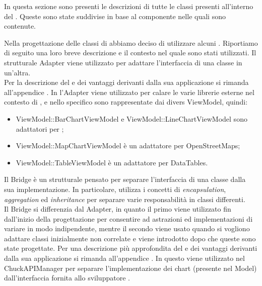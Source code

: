 		In questa sezione sono presenti le descrizioni di tutte le classi presenti all'interno del  . Queste sono state suddivise in base al componente nelle quali sono contenute.
		
		
	
		Nella progettazione delle classi di  abbiamo deciso di utilizzare alcuni . Riportiamo di seguito una loro breve descrizione e il contesto nel quale sono stati utilizzati.
			Il  strutturale Adapter viene utilizzato per adattare l'interfaccia di una classe in un'altra.\\
			Per la descrizione del  e dei vantaggi derivanti dalla sua applicazione si rimanda all'appendice .
				In  l'Adapter viene utilizzato per calare le varie librerie esterne nel contesto di \projectname{}, e nello specifico sono rappresentate dai divers ViewModel, quindi:
				\begin{itemize}
					\item ViewModel::BarChartViewModel e ViewModel::LineChartViewModel sono adattatori per ;
					\item ViewModel::MapChartViewModel è un adattatore per OpenStreetMaps;
					\item ViewModel::TableViewModel è un adattatore per DataTables.
				\end{itemize}
				
			Il Bridge è un  strutturale pensato per separare l'interfaccia di una classe dalla sua implementazione. In particolare, utilizza i concetti di \textit{encapsulation}, \textit{aggregation} ed \textit{inheritance} per separare varie responsabilità in classi differenti. \\
			Il  Bridge si differenzia dal  Adapter, in quanto il primo viene utilizzato fin dall'inizio della progettazione per consentire ad astrazioni ed implementazioni di variare in modo indipendente, mentre il secondo viene usato quando si vogliono adattare classi inizialmente non correlate e viene introdotto dopo che queste sono state progettate.
			Per una descrizione più approfondita del  e dei vantaggi derivanti dalla sua applicazione si rimanda all'appendice .
				In  questo  viene utilizzato nel  ChuckAPIManager per separare l'implementazione dei chart (presente nel  Model) dall'interfaccia fornita allo sviluppatore .
				
